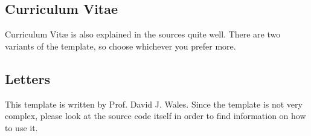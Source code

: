 \documentclass[
]{scrartcl}
\begin{document}
%
\subsection{Curriculum Vitae}

%
Curriculum Vit\ae{} is also explained in the sources quite well.
%
There are two variants of the template, so choose whichever you prefer more.

%
\subsection{Letters}

%
This template is written by Prof. David J. Wales.
%
Since the template is not very complex, please look at the source code itself in
    order to find information on how to use it.
%
\end{document}

